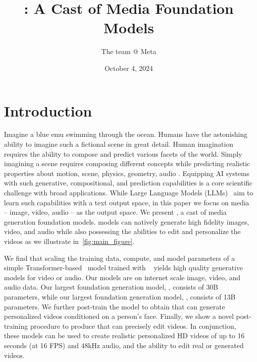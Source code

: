 \documentclass[]{fairmeta}
\title{\OURS: A Cast of Media Foundation Models}
\author[1]{The \OURS team @ Meta}
\affiliation[1]{A detailed contributor list can be found in the appendix of this paper.
}
\date{October 4, 2024}
\begin{document}
\maketitle


\section{Introduction}

Imagine a blue emu swimming through the ocean.
Humans have the astonishing ability to imagine such a fictional scene in great detail.
Human imagination requires the ability to compose and predict various facets of the world.
Simply imagining a scene requires composing different concepts while predicting realistic properties about motion, scene, physics, geometry, audio \etc.
Equipping AI systems with such generative, compositional, and prediction capabilities is a core scientific challenge with broad applications.
While Large Language Models (LLMs)~\citep{llama3,llama2,brown2020language,team2023gemini} aim to learn such capabilities with a text output space, in this paper we focus on media -- image, video, audio -- as the output space.
We present \OURS, a cast of media generation foundation models.
\OURS models can natively generate high fidelity images, video, and audio while also possessing the abilities to edit and personalize the videos as we illustrate in~\cref{fig:main_figure}.



We find that scaling the training data, compute, and model parameters of a simple Transformer-based~\citep{vaswani2017attention} model trained with \flowmatching~\citep{flow-matching} yields high quality generative models for video or audio.
Our models are \pretrained on internet scale image, video, and audio data.
Our largest foundation \textToV generation model, \OursVideo, consists of 30B parameters, while our largest foundation \videoToA generation model, \OursAudio, consists of 13B parameters.
We further post-train the \OursVideo model to obtain \OursPTV that can generate personalized videos conditioned on a person's face.
Finally, we show a novel post-training procedure to produce \OursVideoEdit that can precisely edit videos.
In conjunction, these models can be used to create realistic personalized HD videos of up to 16 seconds (at 16 FPS) and 48kHz audio, and the ability to edit real or generated videos.
\end{document}

